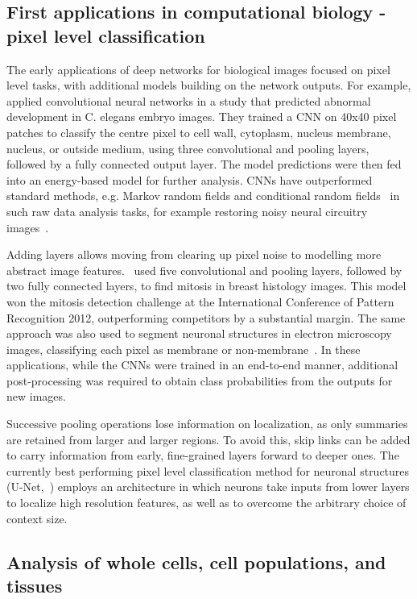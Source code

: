 \subsection{First applications in computational biology - pixel level classification}

The early applications of deep networks for biological images focused on pixel level tasks, with additional models building on the network outputs. For example, \citet{ning_toward_2005} applied convolutional neural networks in a study that predicted abnormal development in C. elegans embryo images. They trained a CNN on 40x40 pixel patches to classify the centre pixel to cell wall, cytoplasm, nucleus membrane, nucleus, or outside medium, using three convolutional and pooling layers, followed by a fully connected output layer. The model predictions were then fed into an energy-based model for further analysis. CNNs have outperformed standard methods, e.g. Markov random fields and conditional random fields~\citep{li_markov_2009} in such raw data analysis tasks, for example restoring noisy neural circuitry images~\citep{jain_supervised_2007}.

Adding layers allows moving from clearing up pixel noise to modelling more abstract image features.~\citep{ciresan_mitosis_2013} used five convolutional and pooling layers, followed by two fully connected layers, to find mitosis in breast histology images. This model won the mitosis detection challenge at the International Conference of Pattern Recognition 2012, outperforming competitors by a substantial margin. The same approach was also used to segment neuronal structures in electron microscopy images, classifying each pixel as membrane or non-membrane~\citep{ciresan_deep_2012}. In these applications, while the CNNs were trained in an end-to-end manner, additional post-processing was required to obtain class probabilities from the outputs for new images.

Successive pooling operations lose information on localization, as only summaries are retained from larger and larger regions. To avoid this, skip links can be added to carry information from early, fine-grained layers forward to deeper ones. The currently best performing pixel level classification method for neuronal structures (U-Net,~\citep{ronneberger_u-net:_2015}) employs an architecture in which neurons take inputs from lower layers to localize high resolution features, as well as to overcome the arbitrary choice of context size.


\subsection{Analysis of whole cells, cell populations, and tissues}

